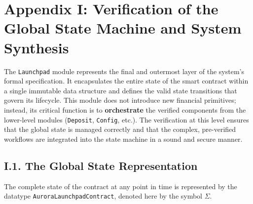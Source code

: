 \documentclass[
  english,
  onecolumn]{article}
\begin{document}
\section{Appendix I: Verification of the Global State Machine and System
Synthesis}\label{appendix-i-verification-of-the-global-state-machine-and-system-synthesis}

The \texttt{Launchpad} module represents the final and outermost layer
of the system's formal specification. It encapsulates the entire state
of the smart contract within a single immutable data structure and
defines the valid state transitions that govern its lifecycle. This
module does not introduce new financial primitives; instead, its
critical function is to \textbf{orchestrate} the verified components
from the lower-level modules (\texttt{Deposit}, \texttt{Config}, etc.).
The verification at this level ensures that the global state is managed
correctly and that the complex, pre-verified workflows are integrated
into the state machine in a sound and secure manner.

\subsection{I.1. The Global State
Representation}\label{i.1.-the-global-state-representation}

The complete state of the contract at any point in time is represented
by the datatype \texttt{AuroraLaunchpadContract}, denoted here by the
symbol \(\Sigma\).
\end{document}
